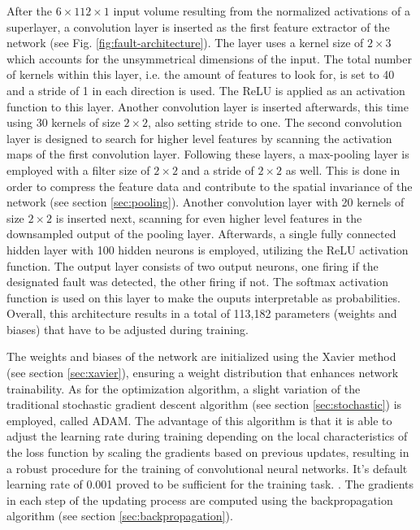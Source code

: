 After the \(6 \times 112 \times 1\) input volume resulting from the
normalized activations of a superlayer, a convolution layer
is inserted as the first feature extractor of the network (see
Fig. \ref{fig:fault-architecture}). The layer
uses a kernel size of \(2 \times 3\) which accounts for the
unsymmetrical dimensions of the input. The total number of kernels
within this layer, i.e. the amount of features to look for, is set to
40 and a stride of 1 in each direction is used. The ReLU is applied
as an activation function to this layer. Another convolution layer is
inserted afterwards, this time using 30 kernels of size \(2 \times
2\), also setting stride to one. The second convolution layer is
designed to search for higher level features by scanning the
activation maps of the first convolution layer.
Following these layers, a max-pooling layer is
employed with a filter size of \(2 \times 2\) and a stride of \(2
\times 2\) as well. This is done in order to compress the feature data
and contribute to the spatial invariance of the network (see section
\ref{sec:pooling}). Another convolution layer with 20
kernels of size \(2 \times 2\) is inserted next, scanning for even
higher level features in the downsampled output of the pooling
layer. Afterwards, a single fully
connected hidden layer with 100 hidden neurons is employed, utilizing
the ReLU activation function. The output layer consists of two
output neurons, one firing if the designated fault was detected, the
other firing if not. The softmax activation function is used on this
layer to make the ouputs interpretable as probabilities. Overall, this
architecture results in a total of 113,182 parameters (weights and
biases) that have to be adjusted during training.

The weights and biases of the network are initialized using the Xavier
method (see section \ref{sec:xavier}), ensuring a weight distribution
that enhances network trainability. As for the optimization algorithm,
a slight variation of the traditional stochastic gradient
descent algorithm (see section \ref{sec:stochastic}) is employed,
called ADAM. The advantage of this algorithm is that it is able to
adjust the learning rate during training depending on the local
characteristics of the loss function by scaling the gradients based on
previous updates, resulting in a robust procedure for the training of
convolutional neural networks. It's default learning rate of 0.001
proved to be sufficient for the training task.
\cite{adam}. The gradients in each step of the updating process
are computed using the backpropagation algorithm (see section
\ref{sec:backpropagation}).

